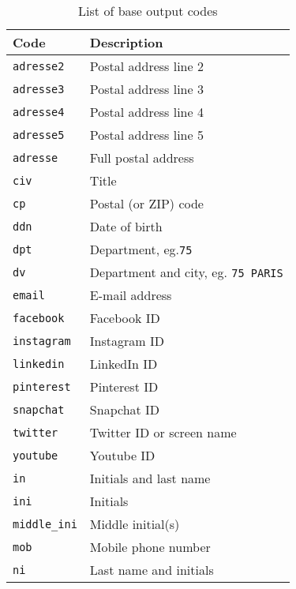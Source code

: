 \documentclass[twoside,twocolumn]{article}
\theoremstyle{definition}
\theoremstyle{remark}
\begin{document}
\begin{table}[htb]
    \centering
    \caption{List of base output codes}
    \begin{tabular*}{0.6\textwidth}{l|l}
        Code & Description \\
        \hline \hline
        \texttt{adresse2} & Postal address line 2 \\
        \hline
        \texttt{adresse3} & Postal address line 3 \\
        \hline
        \texttt{adresse4} & Postal address line 4 \\
        \hline
        \texttt{adresse5} & Postal address line 5 \\
        \hline
        \texttt{adresse} & Full postal address \\
        \hline
        \texttt{civ} & Title \\
        \hline
        \texttt{cp} & Postal (or ZIP) code \\
        \hline
        \texttt{ddn} & Date of birth \\
        \hline
        \texttt{dpt} & Department, eg.\texttt{75} \\
        \hline
        \texttt{dv} & Department and city, eg. \texttt{75 PARIS} \\
        \hline
        \texttt{email} & E-mail address \\
        \hline
        \texttt{facebook} & Facebook ID \\
        \hline
        \texttt{instagram} & Instagram ID \\
        \hline
        \texttt{linkedin} & LinkedIn ID \\
        \hline
        \texttt{pinterest} & Pinterest ID \\
        \hline
        \texttt{snapchat} & Snapchat ID \\
        \hline
        \texttt{twitter} & Twitter ID or screen name \\
        \hline
        \texttt{youtube} & Youtube ID \\
        \hline
        \texttt{in} & Initials and last name \\
        \hline
        \texttt{ini} & Initials \\
        \hline
        \texttt{middle\_ini} & Middle initial(s) \\
        \hline
        \texttt{mob} & Mobile phone number \\
        \hline
        \texttt{ni} & Last name and initials \\

\end{tabular*}
\end{table}
\end{document}
